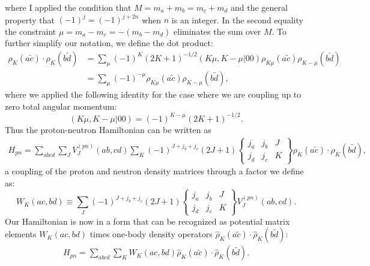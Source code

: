 where I applied the condition that $M=m_a+m_b=m_c+m_d$ and the general property that 
$(-1)^{j} = (-1)^{j+2n}$ when $n$ is an integer. In the second equality the 
constraint  $\mu=m_a-m_c=-(m_b-m_d)$ eliminates the sum over $M$. To further simplify
our notation, we define the dot product:
\begin{equation}\begin{split}
	\rho_{K}(a\tilde{c}) \cdot \rho_{K}(b\tilde{d}) &= \sum_\mu (-1)^K
(2K+1)^{-1/2}(K\mu,K-\mu|00)\rho_{K\mu}(a\tilde{c})\rho_{K-\mu}(b\tilde{d}) \\
	&= \sum_{\mu} (-1)^{-\mu} \rho_{K\mu}(a\tilde{c})\rho_{K-\mu}(b\tilde{d}),
\end{split}\end{equation}
where we applied the following identity for the case where we are coupling 
up to zero total angular momentum\cite{Edmonds}:
\begin{equation}\label{couplezero}
	(K\mu,K-\mu|00) = (-1)^{K-\mu}(2K+1)^{-1/2}.
\end{equation} 
Thus the proton-neutron Hamiltonian can be written as
\begin{equation}\begin{split}
	H_{pn} = \sum_{abcd}\sum_J V_J^{(pn)}(ab,cd)\sum_{K}(-1)^{J+j_b+j_c}(2J+1)
\begin{Bmatrix} j_a & j_b & J \\ j_d & j_c & K \end{Bmatrix}\rho_{K}(a\tilde{c}) 
\cdot \rho_{K}(b\tilde{d}),
\end{split}\end{equation}
a coupling of the proton and neutron density matrices through a  
factor we define as:
\begin{equation} \label{eqn: wmat}
	W_K(ac,bd) \equiv \sum_J (-1)^{J+j_b+j_c}(2J+1)\begin{Bmatrix} j_a & j_b & J \\ 
j_d & j_c & K \end{Bmatrix}V_J^{(pn)}(ab,cd).
\end{equation}
Our Hamiltonian is now in a form that can be recognized as potential matrix elements
$W_K(ac,bd)$ times one-body density operators $\hat{\rho}_{K}(a\tilde{c}) \cdot \hat{\rho}_{K}
(b\tilde{d})$:
\begin{equation}\begin{split}\label{Hpnfull}
	H_{pn} = \sum_{abcd}\sum_{K}W_K(ac,bd)\hat{\rho}_{K}(a\tilde{c}) \cdot \hat{\rho}_{K} (b\tilde{d}).
\end{split}\end{equation}



